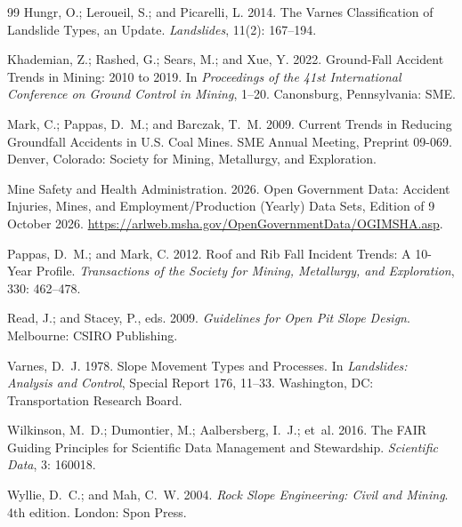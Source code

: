 \documentclass[letterpaper,twocolumn,10pt]{article}
\begin{document}
\begin{thebibliography}{99}
Hungr, O.; Leroueil, S.; and Picarelli, L. 2014.
\newblock The Varnes Classification of Landslide Types, an Update.
\newblock \emph{Landslides}, 11(2): 167--194.

Khademian, Z.; Rashed, G.; Sears, M.; and Xue, Y. 2022.
\newblock Ground-Fall Accident Trends in Mining: 2010 to 2019.
\newblock In \emph{Proceedings of the 41st International Conference on Ground Control in Mining}, 1--20. Canonsburg, Pennsylvania: SME.

Mark, C.; Pappas, D.~M.; and Barczak, T.~M. 2009.
\newblock Current Trends in Reducing Groundfall Accidents in U.S. Coal Mines.
\newblock SME Annual Meeting, Preprint 09-069. Denver, Colorado: Society for Mining, Metallurgy, and Exploration.

Mine Safety and Health Administration. 2026.
\newblock Open Government Data: Accident Injuries, Mines, and Employment/Production (Yearly) Data Sets, Edition of 9 October 2026.
\newblock \url{https://arlweb.msha.gov/OpenGovernmentData/OGIMSHA.asp}.

Pappas, D.~M.; and Mark, C. 2012.
\newblock Roof and Rib Fall Incident Trends: A 10-Year Profile.
\newblock \emph{Transactions of the Society for Mining, Metallurgy, and Exploration}, 330: 462--478.

Read, J.; and Stacey, P., eds. 2009.
\newblock \emph{Guidelines for Open Pit Slope Design}.
\newblock Melbourne: CSIRO Publishing.

Varnes, D.~J. 1978.
\newblock Slope Movement Types and Processes.
\newblock In \emph{Landslides: Analysis and Control}, Special Report 176, 11--33. Washington, DC: Transportation Research Board.

Wilkinson, M.~D.; Dumontier, M.; Aalbersberg, I.~J.; et~al. 2016.
\newblock The FAIR Guiding Principles for Scientific Data Management and Stewardship.
\newblock \emph{Scientific Data}, 3: 160018.

Wyllie, D.~C.; and Mah, C.~W. 2004.
\newblock \emph{Rock Slope Engineering: Civil and Mining}.
\newblock 4th edition. London: Spon Press.
\end{thebibliography}
\end{document}
